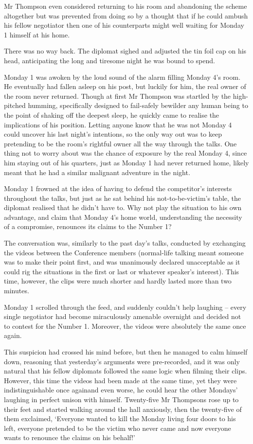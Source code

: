 Mr Thompson even considered returning to his room and abandoning the
scheme altogether but was prevented from doing so by a thought that if
he could ambush his fellow negotiator then one of his counterparts
might well waiting for Monday 1 himself at his home.

There was no way back. The diplomat sighed and adjusted the tin foil
cap on his head, anticipating the long and tiresome night he was bound
to spend.

\hsep

Monday 1 was awoken by the loud sound of the alarm filling Monday 4's
room. He eventually had fallen asleep on his post, but luckily for
him, the real owner of the room never returned. Though at first Mr
Thompson was startled by the high-pitched humming, specifically
designed to fail-safely bewilder any human being to the point of
shaking off the deepest sleep, he quickly came to realise the
implications of his position. Letting anyone know that he was not
Monday 4 could uncover his last night's intentions, so the only way
out was to keep pretending to be the room's rightful owner all the way
through the talks. One thing not to worry about was the chance of
exposure by the real Monday 4, since him staying out of his quarters,
just as Monday 1 had never returned home, likely meant that he had a
similar malignant adventure in the night.

Monday 1 frowned at the idea of having to defend the competitor's
interests throughout the talks, but just as he sat behind his
not-to-be-victim's table, the diplomat realised that he didn't have
to. Why not play the situation to his own advantage, and claim that
Monday 4's home world, understanding the necessity of a compromise,
renounces its claims to the Number 1?

The conversation was, similarly to the past day's talks, conducted by
exchanging the videos between the Conference members (normal-life
talking meant someone was to make their point first, and was
unanimously declared unacceptable as it could rig the situations in
the first or last or whatever speaker's interest). This time, however,
the clips were much shorter and hardly lasted more than two minutes.

Monday 1 scrolled through the feed, and suddenly couldn't help
laughing – every single negotiator had become miraculously amenable
overnight and decided not to contest for the Number 1. Moreover, the
videos were absolutely the same once again.

This suspicion had crossed his mind before, but then he managed to
calm himself down, reasoning that yesterday's arguments were
pre-recorded, and it was only natural that his fellow diplomats
followed the same logic when filming their clips. However, this time
the videos had been made at the same time, yet they were
indistinguishable once again\textemdash and even worse, he could
hear the other Mondays' laughing in perfect unison with himself.
Twenty-five Mr Thompsons rose up to their feet and started walking
around the hall anxiously, then the twenty-five of them exclaimed,
`Everyone wanted to kill the Monday living four doors to his left,
everyone pretended to be the victim who never came and now everyone
wants to renounce the claims on his behalf!'

